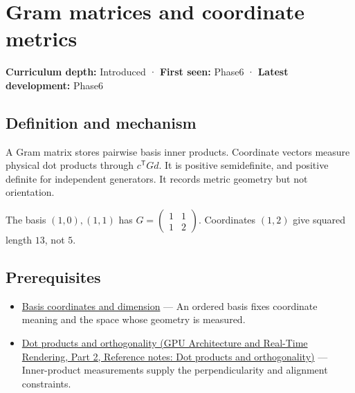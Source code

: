 \hypertarget{appendix-3b863809f82a}{}\label{referencestart:appendix-3b863809f82a}
\section{Gram matrices and coordinate metrics}\label{appendix-3b863809f82a-gram-matrices-and-coordinate-metrics}

\hypertarget{appendix-3b863809f82a-gram-matrices-and-coordinate-metrics}{}

\textbf{Curriculum depth:} Introduced · \textbf{First seen:} Phase6 · \textbf{Latest development:} Phase6

\begin{allmightroledefinition}

\subsection{Definition and mechanism}\label{appendix-3b863809f82a-definition-and-mechanism}

\hypertarget{appendix-3b863809f82a-definition-and-mechanism}{}

A Gram matrix stores pairwise basis inner products. Coordinate vectors measure physical dot products through \(c^\mathsf TGd\). It is positive semidefinite, and positive definite for independent generators. It records metric geometry but not orientation.

\end{allmightroledefinition}

The basis \((1,0),(1,1)\) has \(G=\begin{pmatrix}1&1\\1&2\end{pmatrix}\). Coordinates \((1,2)\) give squared length \(13\), not \(5\).

\subsection{Prerequisites}\label{appendix-3b863809f82a-prerequisites}

\hypertarget{appendix-3b863809f82a-prerequisites}{}

\begin{itemize}
\tightlist
\item
  \hyperref[appendix-ce0341f7ea0d]{Basis coordinates and dimension} --- An ordered basis fixes coordinate meaning and the space whose geometry is measured.
\item
  \href{../06-GPU-Architecture-and-Real-Time-Rendering-P02/main.pdf\#appendix-8bc4e8fc547c}{Dot products and orthogonality (GPU Architecture and Real-Time Rendering, Part 2, Reference notes: Dot products and orthogonality)} --- Inner-product measurements supply the perpendicularity and alignment constraints.
\end{itemize}

